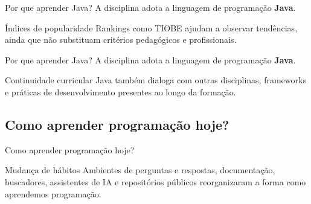 \begin{frame}{Por que aprender Java?}
A disciplina adota a linguagem de programação \textbf{Java}.

\begin{block}{Índices de popularidade}
Rankings como TIOBE ajudam a observar tendências, ainda que não substituam critérios pedagógicos e profissionais.
\end{block}

\end{frame}

\begin{frame}{Por que aprender Java?}
A disciplina adota a linguagem de programação \textbf{Java}.

\begin{block}{Continuidade curricular}
Java também dialoga com outras disciplinas, frameworks e práticas de desenvolvimento presentes ao longo da formação.
\end{block}

\end{frame}

\subsection{Como aprender programação hoje?}

\begin{frame}{Como aprender programação hoje?}
\begin{block}{Mudança de hábitos}
Ambientes de perguntas e respostas, documentação, buscadores, assistentes de IA e repositórios públicos reorganizaram a forma como aprendemos programação.
\end{block}

\end{frame}

